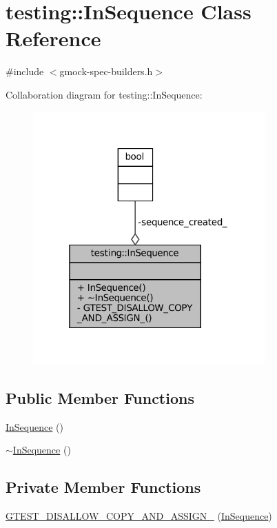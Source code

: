 \hypertarget{classtesting_1_1InSequence}{}\section{testing\+:\+:In\+Sequence Class Reference}
\label{classtesting_1_1InSequence}


{\ttfamily \#include $<$gmock-\/spec-\/builders.\+h$>$}



Collaboration diagram for testing\+:\+:In\+Sequence\+:
\nopagebreak
\begin{figure}[H]
\begin{center}
\leavevmode
\includegraphics[width=253pt]{classtesting_1_1InSequence__coll__graph}
\end{center}
\end{figure}
\subsection*{Public Member Functions}
\begin{DoxyCompactItemize}
\item 
\hyperlink{classtesting_1_1InSequence_ac40a4ac3e4f26e088ebc09e543514b6b}{In\+Sequence} ()
\item 
\hyperlink{classtesting_1_1InSequence_afe11b11ccb5f55daea5f1e0a9a1af48f}{$\sim$\+In\+Sequence} ()
\end{DoxyCompactItemize}
\subsection*{Private Member Functions}
\begin{DoxyCompactItemize}
\item 
\hyperlink{classtesting_1_1InSequence_a9c39af86c33e18340f50136eefd7b694}{G\+T\+E\+S\+T\+\_\+\+D\+I\+S\+A\+L\+L\+O\+W\+\_\+\+C\+O\+P\+Y\+\_\+\+A\+N\+D\+\_\+\+A\+S\+S\+I\+G\+N\+\_\+} (\hyperlink{classtesting_1_1InSequence}{In\+Sequence})
\end{DoxyCompactItemize}
